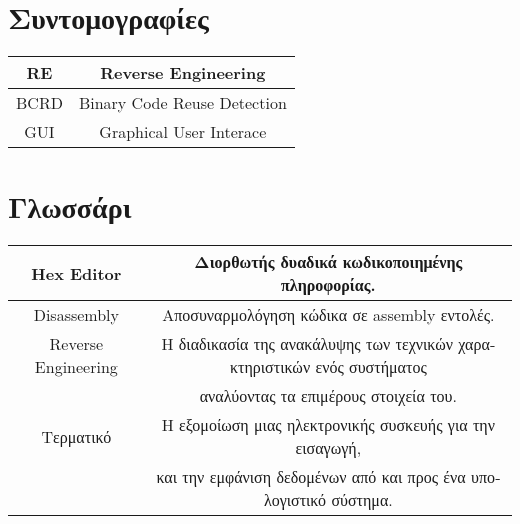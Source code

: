 \documentclass[12pt]{article}
\begin{document}
\begin{greek}


\pagebreak
\tableofcontents

\pagebreak


\pagebreak
\listoffigures

\pagebreak
\listoftables 

\pagebreak
\section*{Συντομογραφίες}
\begin{table}[ht]
\centering
\begin{tabular}{| c | c |}
\hline
RE & Reverse Engineering \\
\hline
BCRD & Binary Code Reuse Detection \\
\hline
GUI & Graphical User Interace \\
\hline
\end{tabular}
\end{table}
\pagebreak 

\pagebreak
\section*{Γλωσσάρι}
\begin{table}[ht]
\centering
\begin{tabular}{| c | c |}
\hline
Hex Editor & Διορθωτής δυαδικά κωδικοποιημένης πληροφορίας. \\
\hline
Disassembly & Αποσυναρμολόγηση κώδικα σε assembly εντολές. \\
\hline
Reverse Engineering & Η διαδικασία της ανακάλυψης των τεχνικών χαρακτηριστικών ενός συστήματος \\
				    & αναλύοντας τα επιμέρους στοιχεία του. \\
\hline
Τερματικό & Η εξομοίωση μιας ηλεκτρονικής συσκευής για την εισαγωγή, \\
          & και την εμφάνιση δεδομένων από και προς ένα υπολογιστικό σύστημα. \\
\hline
\end{tabular}
\end{table}
\pagebreak 



\pagebreak

\pagebreak

\pagebreak

\pagebreak

\pagebreak

\pagebreak



\end{greek}
\end{document}
